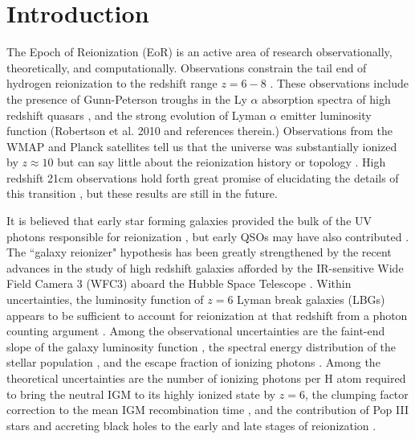 \section{Introduction}
\label{sec:introduction}

The Epoch of Reionization (EoR) is an active area of research observationally,
theoretically, and computationally. Observations constrain the tail end of hydrogen reionization
to the redshift range $z=6-8$ \citep{RobertsonEtAl2010}. These observations include the presence of Gunn-Peterson
troughs in the Ly $\alpha$ absorption spectra of high redshift quasars \citep{FanEtAl2006}, and 
the strong evolution of Lyman $\alpha$ emitter luminosity function (Robertson et al. 2010 and references
therein.) 
Observations from the WMAP and Planck satellites tell us that the universe was substantially 
ionized by $z \approx 10$ but can say little about the
reionization history or topology \citep{JarosikEtAl2011,Planck2013}. 
High redshift 21cm observations hold forth great promise of elucidating the details of this transition \citep{BarkanaLoeb2007, PritchardLoeb2012}, but these results are still in the future. 

It is believed that early star forming galaxies provided the bulk of the UV photons responsible for
reionization \citep{RobertsonEtAl2010,RobertsonEtAl2013}, but early QSOs may have also contributed \citep{MadauEtAl1999, BoltonHaehnelt2007, HaardtMadau2012}.  The ``galaxy reionizer" hypothesis has been greatly strengthened by the recent advances in the study of high redshift galaxies afforded by the IR-sensitive Wide Field Camera 3 (WFC3) aboard the Hubble Space Telescope \citep[e.g.][]{RobertsonEtAl2010, RobertsonEtAl2013, BouwensEtAl2011, BouwensEtAl2011b, OeschEtAl2013}.  Within uncertainties, the luminosity function of $z=6$ Lyman break galaxies (LBGs) appears to be sufficient to account for reionization at that redshift from a photon counting argument \citep{BoltonHaehnelt2007, RobertsonEtAl2010, BouwensEtAl2012}. Among the observational uncertainties are the faint-end slope of the galaxy luminosity function \citep{WiseCen2009,LabbeEtAl2010,BouwensEtAl2012}, the spectral energy distribution of the stellar population \citep{CowieEtAl2009,WillotEtAl2010,HaardtMadau2012}, and the escape fraction of ionizing photons \citep{WyitheEtAl2010, YajimaEtAl2011, MitraEtAl2013}. Among the theoretical uncertainties are the number of ionizing photons per H atom required to bring the neutral IGM to its highly ionized state by $z=6$, the clumping factor correction to the mean IGM recombination time \citep{PawlikEtAl2009, RaicevicTheuns2011, FinlatorEtAl2012, ShullEtAl2012, RobertsonEtAl2013}, 
and the contribution of Pop III stars and accreting black holes to the early and late stages of reionization \citep{BoltonHaehnelt2007,TracGnedin2011,AhnEtAl2012}. 

